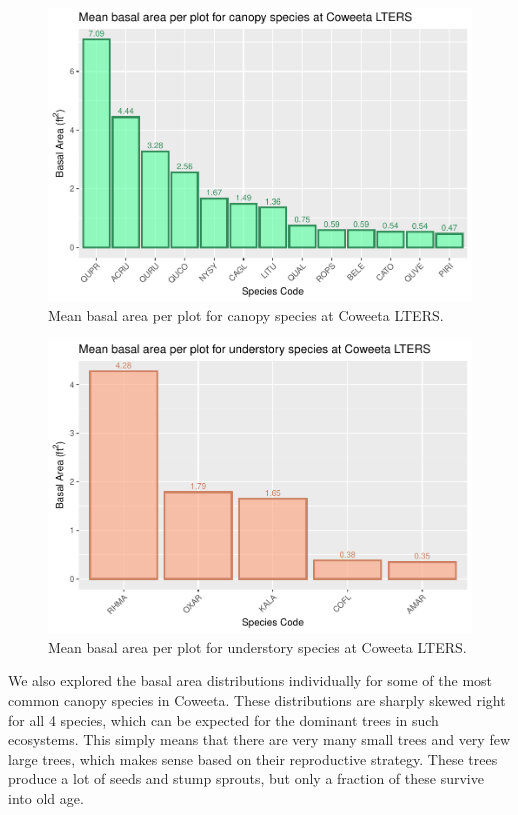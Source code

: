 \documentclass[
  12pt,
]{article}
\begin{document}
\begin{figure}
\centering
\includegraphics{ProjectDraft_files/figure-latex/unnamed-chunk-2-1.pdf}
\caption{Mean basal area per plot for canopy species at Coweeta LTERS.}
\end{figure}

\begin{figure}
\centering
\includegraphics{ProjectDraft_files/figure-latex/unnamed-chunk-3-1.pdf}
\caption{Mean basal area per plot for understory species at Coweeta
LTERS.}
\end{figure}

We also explored the basal area distributions individually for some of
the most common canopy species in Coweeta. These distributions are
sharply skewed right for all 4 species, which can be expected for the
dominant trees in such ecosystems. This simply means that there are very
many small trees and very few large trees, which makes sense based on
their reproductive strategy. These trees produce a lot of seeds and
stump sprouts, but only a fraction of these survive into old age.
\end{document}
